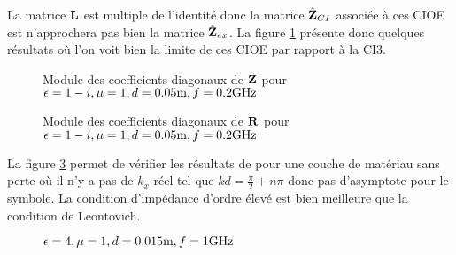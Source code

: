       La matrice \(\mathbf{L}\) est multiple de l'identité donc la matrice \(\hat{\mathbf{Z}}_{CI}\) associée à ces CIOE est n'approchera pas bien la matrice \(\hat{\mathbf{Z}}_{ex}\). La figure \ref{fig:imp_fourier:plan:stupfel:hoibc} présente donc quelques résultats où l'on voit bien la limite de ces CIOE par rapport à la CI3.
      \begin{figure}[!hbt]
        \centering
        
        \caption[CIOE sur empilement de B.~Stupfel p.~1661]{Module des coefficients diagonaux de \(\hat{\mathbf{Z}}\) pour \(\epsilon = 1-i, \mu = 1, d=0.05\text{m}, f=0.2\text{GHz}\)}
        \label{fig:imp_fourier:plan:stupfel:hoibc}
      \end{figure}
      \begin{table}[!hbt]
        \centering

        \caption{Coefficients associés à la figure \ref{fig:imp_fourier:plan:stupfel:hoibc}}
        \label{tab:imp_fourier:plan:stupfel:hoibc}
      \end{table}
      
      \begin{figure}[!hbt]
        \centering
        
        \caption[CIOE sur empilement de B.~Stupfel p.~1661]{Module des coefficients diagonaux de \(\mathbf{R}\) pour \(\epsilon = 1-i, \mu = 1, d=0.05\text{m}, f=0.2\text{GHz}\)}
        \label{fig:reflex_fourier:plan:stupfel:hoibc}
      \end{figure}

      La figure \ref{fig:imp_fourier:plan:hoppe:33:hoibc} permet de vérifier les résultats de \cite[p.~33]{hoppe_impedance_1995} pour une couche de matériau sans perte où il n'y a pas de \(k_x\) réel tel que \(kd=\frac{\pi}{2} + n \pi\) donc pas d'asymptote pour le symbole. La condition d'impédance d'ordre élevé est bien meilleure que la condition de Leontovich.
      \begin{figure}[!hbt]
          \centering
          
          \caption[CIOE sur empilement de Hoppe & Rahmat-Samii p.~33]{\(\epsilon = 4, \mu = 1, d=0.015\text{m}, f=1\text{GHz}\)}
          \label{fig:imp_fourier:plan:hoppe:33:hoibc}
      \end{figure}
      \begin{table}[!hbt]
        \centering
        \caption{Coefficients associés à la figure \ref{fig:imp_fourier:plan:hoppe:33:hoibc}}
        \label{tab:imp_fourier:plan:hoppe:33:hoibc}
      \end{table}

